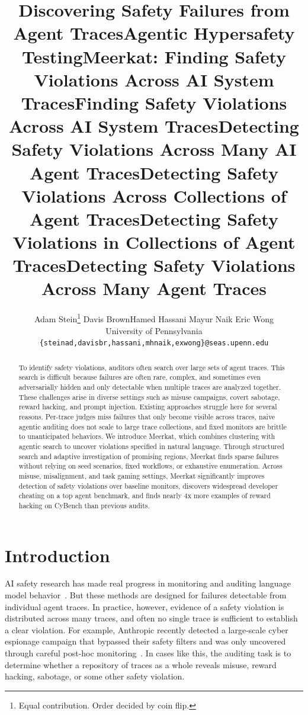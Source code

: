 \documentclass{article} %
\title{Discovering Safety Failures from Agent Traces}
\title{Agentic Hypersafety Testing}
\title{Meerkat: Finding Safety Violations Across AI System Traces}
\title{Finding Safety Violations Across AI System Traces}
\title{Detecting Safety Violations Across Many AI Agent Traces}
\title{Detecting Safety Violations Across Collections of Agent Traces}
\title{Detecting Safety Violations in Collections of Agent Traces}
\title{Detecting Safety Violations Across Many Agent Traces}
\author{Adam Stein\thanks{Equal contribution. Order decided by coin flip.} \quad Davis Brown\footnotemark[1] \quad Hamed Hassani \quad Mayur Naik \quad Eric Wong \\
University of Pennsylvania\\
\texttt{\{steinad,davisbr,hassani,mhnaik,exwong\}@seas.upenn.edu}
}
\newcommand{\ourmethod}{Meerkat\xspace}
\begin{document}
\ifcolmsubmission
\linenumbers
\fi

\maketitle

\begin{abstract}



To identify safety violations, auditors often search over large sets of agent traces. This search is difficult because failures are often rare, complex, and sometimes even adversarially hidden and only detectable when multiple traces are analyzed together. These challenges arise in diverse settings such as misuse campaigns, covert sabotage, reward hacking, and prompt injection. Existing approaches struggle here for several reasons. Per-trace judges miss failures that only become visible across traces, naive agentic auditing does not scale to large trace collections, and fixed monitors are brittle to unanticipated behaviors. We introduce \ourmethod, which combines clustering with agentic search to uncover violations specified in natural language. Through structured search and adaptive investigation of promising regions, \ourmethod finds sparse failures without relying on seed scenarios, fixed workflows, or exhaustive enumeration. Across misuse, misalignment, and task gaming settings, \ourmethod significantly improves detection of safety violations over baseline monitors, discovers widespread developer cheating on a top agent benchmark, and finds nearly 4x more examples of reward hacking on CyBench than previous audits.




\end{abstract}

\section{Introduction}

AI safety research has made real progress in monitoring and auditing language model behavior~\citep{greenblatt2023ai,marks2025auditing,baker2025monitoring}. But these methods are designed for failures detectable from individual agent traces. In practice, however, evidence of a safety violation is distributed across many traces, and often no single trace is sufficient to establish a clear violation. For example, Anthropic recently detected a large-scale cyber espionage campaign that bypassed their safety filters and was only uncovered through careful post-hoc monitoring~\citep{anthropic2025disrupting}. In cases like this, the auditing task is to determine whether a repository of traces as a whole reveals misuse, reward hacking, sabotage, or some other safety violation.
\end{document}
